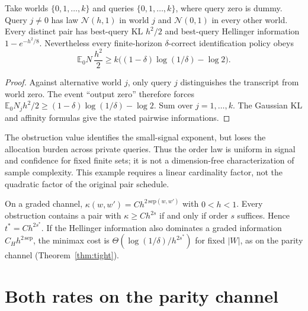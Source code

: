 \begin{proposition}
\label{prop:privatequery}
Take worlds $\{0,1,\ldots,k\}$ and queries $\{0,1,\ldots,k\}$, where query zero is dummy.
Query $j\ne0$ has law $\mathcal N(h,1)$ in world $j$ and $\mathcal N(0,1)$ in every other
world. Every distinct pair has best-query KL $h^2/2$ and best-query Hellinger information
$1-e^{-h^2/8}$. Nevertheless every finite-horizon $\delta$-correct identification policy obeys
\[
\mathbb E_0N\,\frac{h^2}{2}\ge
k\bigl((1-\delta)\log(1/\delta)-\log2\bigr).
\]
\end{proposition}
\begin{proof}
Against alternative world $j$, only query $j$ distinguishes the transcript from world zero.
The event ``output zero'' therefore forces
$\mathbb E_0N_j h^2/2\ge(1-\delta)\log(1/\delta)-\log2$. Sum over $j=1,\ldots,k$.
The Gaussian KL and affinity formulas give the stated pairwise informations.
\end{proof}
The obstruction value identifies the small-signal exponent, but loses the allocation burden
across private queries. Thus the order law is uniform in signal and confidence for fixed
finite sets; it is not a dimension-free characterization of sample complexity. This example
requires a linear cardinality factor, not the quadratic factor of the original pair schedule.

\begin{theorem}
\label{thm:order}
On a graded channel, $\kappa(w,w')=Ch^{2\,\mathrm{sep}(w,w')}$ with $0<h<1$. Every obstruction
contains a pair with $\kappa\ge Ch^{2s}$ if and only if order $s$ suffices. Hence
$t^{*}=Ch^{2s^{*}}$. If the Hellinger information also dominates a graded information
$C_{H}h^{2\,\mathrm{sep}}$, the minimax cost is $\Theta(\log(1/\delta)/h^{2s^{*}})$ for fixed $|W|$, as on
the parity channel (Theorem~\ref{thm:tight}).
\end{theorem}


\section{Both rates on the parity channel}
\label{sec:parity}

